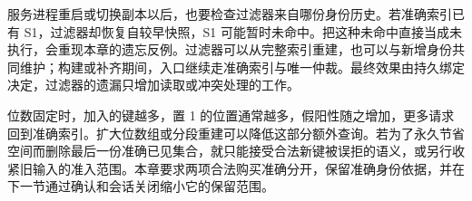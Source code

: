 服务进程重启或切换副本以后，也要检查过滤器来自哪份身份历史。若准确索引已有 S1，过滤器却恢复自较早快照，S1 可能暂时未命中。把这种未命中直接当成未执行，会重现本章的遗忘反例。过滤器可以从完整索引重建，也可以与新增身份共同维护；构建或补齐期间，入口继续走准确索引与唯一仲裁。最终效果由持久绑定决定，过滤器的遗漏只增加读取或冲突处理的工作。

位数固定时，加入的键越多，置 1 的位置通常越多，假阳性随之增加，更多请求回到准确索引。扩大位数组或分段重建可以降低这部分额外查询。若为了永久节省空间而删除最后一份准确已见集合，就只能接受合法新键被误拒的语义，或另行收紧旧输入的准入范围。本章要求两项合法购买准确分开，保留准确身份依据，并在下一节通过确认和会话关闭缩小它的保留范围。
\FloatBarrier
